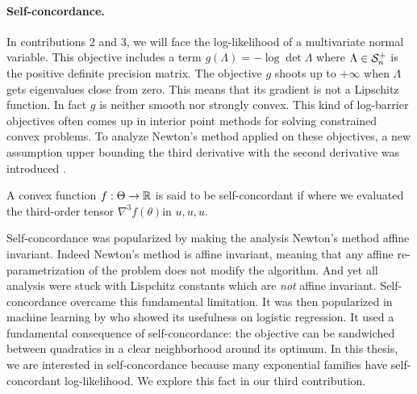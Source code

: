 \paragraph{Self-concordance.}
In contributions 2 and 3, we will face the log-likelihood of a multivariate normal variable.
This objective includes a term $g(\Lambda) = -\log \det \Lambda$ where $\Lambda\in {\mathcal S}_n^+$ is the positive definite precision matrix.
The objective $g$ shoots up to $+\infty$ when $\Lambda$ gets eigenvalues close from zero.
This means that its gradient is not a Lipschitz function.
In fact  $g$ is neither smooth nor strongly convex.
This kind of log-barrier objectives often comes up in interior point methods for solving constrained convex problems.
To analyze Newton's method applied on these objectives, a new assumption upper bounding the third derivative with the second derivative was introduced \citep{nemirovski1983problem}.
\begin{definition}
	\citep[definition 4.1.1]{nesterov2004Intro}
	A convex function $f:\Theta \rightarrow\mathbb{R}$ is said to be self-concordant if
	where we evaluated the third-order tensor $\nabla^3 f(\theta)$in $u,u,u$.
\end{definition}
Self-concordance was popularized by making the analysis Newton's method affine invariant.
Indeed Newton's method is affine invariant, meaning that any affine re-parametrization of the problem does not modify the algorithm.
And yet all analysis were stuck with Lispchitz constants which are \emph{not} affine invariant.
Self-concordance overcame this fundamental limitation.
It was then popularized in machine learning by \citet{bach2010self} who showed its usefulness on logistic regression.
It used a fundamental consequence of self-concordance: the objective can be sandwiched between quadratics in a clear neighborhood around its optimum. 
In this thesis, we are interested in self-concordance because many exponential families have self-concordant log-likelihood. 
We explore this fact in our third contribution.

